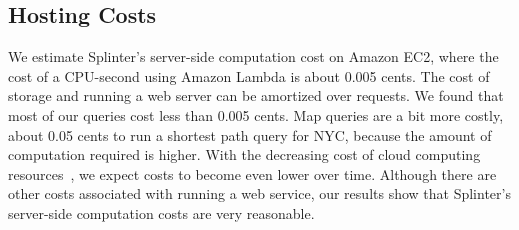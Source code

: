 %

\subsection{Hosting Costs}
\label{sec:pricing}
We estimate Splinter's server-side computation cost on Amazon EC2, 
where the cost of a CPU-second using Amazon Lambda is about 0.005 cents. 
The cost of storage and running a web server can be amortized over requests.
We found that most of our queries cost less than 0.005 cents. Map queries are a bit more costly,
about 0.05 cents to run a shortest path query for NYC, because the amount of 
computation required is higher. With the decreasing cost of cloud computing resources~\cite{decrease-aws},
we expect costs to become even lower over time. Although there are other costs associated with running a web service,
our results show that Splinter's server-side computation costs are very reasonable.


